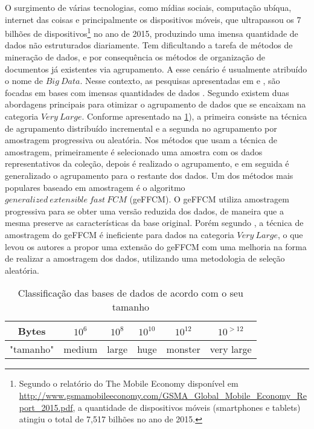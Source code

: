 O surgimento de várias tecnologias, como mídias sociais, computação ubíqua, internet das coisas e
principalmente os dispositivos móveis, que ultrapassou os 7 bilhões de dispositivos\footnote{Segundo
  o relatório do The Mobile Economy disponível em
  \url{http://www.gsmamobileeconomy.com/GSMA_Global_Mobile_Economy_Report_2015.pdf}, a quantidade de
dispositivos móveis (smartphones e tablets) atingiu o total de 7,517 bilhões no ano de 2015.} no ano
de 2015, produzindo uma imensa quantidade de dados não estruturados diariamente. Tem dificultando a
tarefa de métodos de mineração de dados, e por consequência os métodos de organização de documentos
já existentes via agrupamento. A esse cenário é usualmente atribuído o nome de $Big\ Data$. Nesse
contexto, as pesquisas apresentadas em  e , são focadas
em bases com imensas quantidades de dados . Segundo  existem duas abordagens
principais para otimizar o agrupamento de dados que se encaixam na categoria $Very\ Large$. Conforme
apresentado na  \ref{table:datasize}), a primeira consiste na técnica de agrupamento distribuído
incremental e a segunda no agrupamento por amostragem progressiva ou aleatória. Nos métodos que usam
a técnica de amostragem, primeiramente é selecionado uma amostra com os dados representativos da
coleção, depois é realizado o agrupamento, e em seguida é generalizado o agrupamento para o restante
dos dados. Um dos métodos mais populares baseado em amostragem é o algoritmo $generalized\
extensible\ fast\ FCM$ (geFFCM)\cite{Havens2012}. O geFFCM utiliza amostragem progressiva para se
obter uma versão reduzida dos dados, de maneira que a mesma preserve as características da base
original. Porém segundo \citeonline{Havens2012}, a técnica de amostragem do geFFCM é ineficiente para
dados na categoria $Very\ Large$, o que levou os autores a propor uma extensão do geFFCM com uma
melhoria na forma de realizar a amostragem dos dados, utilizando uma metodologia de seleção
aleatória.

\begin{table}[!htp]
  \centering
  \begin{tabular}{ |c|c c c c c|}
    \hline
    Bytes & $10^6$ & $10^8$ & $10^{10}$ & $10^{12}$ & $10^{>12}$ \\
    \hline
    "tamanho" & medium & large & huge & monster & very large \\
    \hline
  \end{tabular}
  \caption{Classificação das bases de dados de acordo com o seu tamanho \cite{Havens2012}}
  \label{table:datasize}
\end{table}

